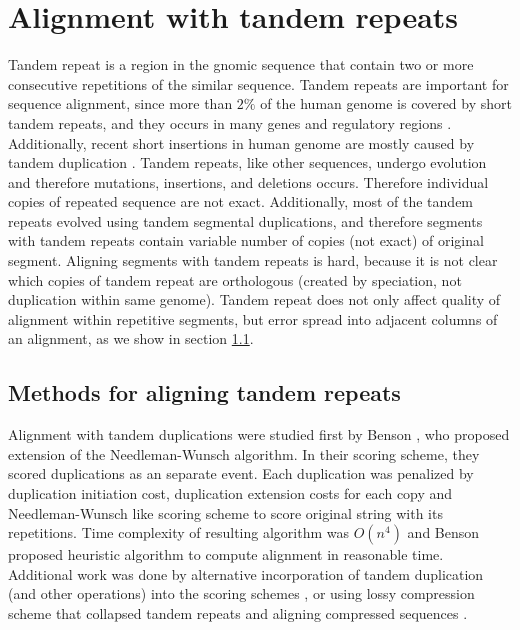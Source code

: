 \chapter{Alignment with tandem repeats}

Tandem repeat is a region in the gnomic sequence that contain two or more
consecutive repetitions of the similar sequence.  Tandem repeats are important
for sequence alignment, since more than $2\%$ of the human genome is covered by
short tandem repeats, and they occurs in many genes and regulatory regions
\cite{Gemayel2010}. Additionally, recent short insertions in human genome are
mostly caused by tandem duplication \cite{Messer2007}.  Tandem repeats, like
other sequences, undergo evolution and therefore mutations, insertions, and
deletions occurs. Therefore individual copies of repeated sequence are not
exact.  Additionally, most of the tandem repeats evolved using tandem segmental
duplications, and therefore segments with tandem repeats contain variable
number of copies (not exact) of original segment. Aligning segments with tandem
repeats is hard, because it is not clear which copies of tandem repeat are
orthologous (created by speciation, not duplication within same genome).
Tandem repeat does not only affect quality of alignment within repetitive
segments, but error spread into adjacent columns of an alignment, as we show in
section \ref{}.



\section{Methods for aligning tandem repeats}

Alignment with tandem duplications were studied first by Benson
\cite{Benson1997}, who proposed extension of the Needleman-Wunsch
algorithm. In their scoring scheme, they scored duplications as an separate
event. Each duplication was penalized by duplication initiation cost,
duplication extension costs for each copy and Needleman-Wunsch like scoring
scheme to score original string with its repetitions. Time complexity of
resulting algorithm was $O(n^4)$ and Benson proposed heuristic algorithm to
compute alignment in reasonable time.  Additional work was done by alternative incorporation of
tandem duplication (and other operations) into the scoring schemes
\cite{Sammeth2006, Berard2006, Freschi2012}, or using lossy compression scheme
that collapsed tandem repeats and aligning compressed sequences
\cite{Freschi2012}.

